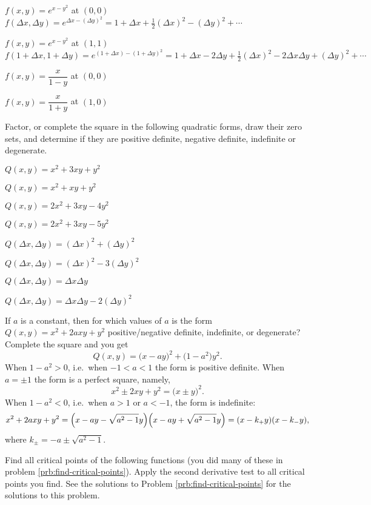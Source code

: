 \begin{multicols}{2}
\subprob  $f(x, y) =e^{x-y^2}$ at $(0,0)$ 
\answer
$f(\Delta x,\Delta y) = e^{\Delta x-(\Delta y)^2} =
1+\Delta x+\frac{1}{2}(\Delta x)^2 -(\Delta y)^2+\cdots$
\endanswer

\subprob  $f(x, y) =e^{x-y^2}$ at $(1,1)$
\answer
$f(1+\Delta x, 1+\Delta y)
= e^{(1+\Delta x)-(1+\Delta y)^2}
=
1+\Delta x - 2\Delta y+ \frac{1}{2}(\Delta x)^2 - 2\Delta x\Delta y
+(\Delta y)^2+\cdots$
\endanswer

\subprob  $f(x, y) =\dfrac{x}{1-y}$ at $(0,0)$ 

\subprob  $f(x, y) =\dfrac{x}{1+y}$ at $(1,0)$ 

\problem Factor, or complete the square in the following quadratic 
forms, draw their zero sets, and determine if they are positive
definite, negative definite, indefinite or degenerate.

\subprob $Q(x, y) = x^2+3xy+y^2$ 

\subprob $Q(x, y) = x^2 + xy + y^2$  

\subprob $Q(x, y) = 2x^2 +3xy - 4y^2$  

\subprob $Q(x, y) = 2x^2 + 3xy - 5y^2$ 

\subprob $Q(\Delta x, \Delta y) = (\Delta x)^2 + (\Delta y)^2$  

\subprob $Q(\Delta x, \Delta y) = (\Delta x)^2 - 3(\Delta y)^2$  

\subprob $Q(\Delta x, \Delta y) = \Delta x \Delta y$ 

\subprob $Q(\Delta x, \Delta y) = \Delta x \Delta y -2 (\Delta y)^2$ 

\problem If $a$ is a constant, then for which values 
of $a$ is the form $Q(x, y) = x^2 + 2axy + y^2$ positive/negative
definite, indefinite, or degenerate?
\answer  Complete the square and you get
\[
Q(x, y) = \bigl(x-ay\bigr)^2 + \bigl(1- a^2\bigr)y^2. 
\]
When $1-a^2>0$, i.e.\ when $-1<a<1$ the form is positive definite.
When $a=\pm 1$ the form is a perfect square, namely, 
\[
x^2 \pm 2xy + y^2 = \bigl(x\pm y\bigr)^2.
\]
When $1-a^2<0$, i.e.\ when $a>1$ or $a<-1$, the form is indefinite:
\[
x^2 + 2axy + y^2 = 
\Bigl(x-ay-\sqrt{a^2-1}y\Bigr)
\Bigl(x-ay+\sqrt{a^2-1}y\Bigr)
=(x-k_+y)(x-k_-y),
\]
where $k_\pm = -a \pm \sqrt{a^2-1}$.

\endanswer

\problem \label{prb:lots-of-2nd-deriv-tests} 
Find all critical points of the following functions (you did many of
these in problem \ref{prb:find-critical-points}).  Apply the second
derivative test to all critical points you find.
\answer 
See the solutions to Problem \ref{prb:find-critical-points} for the
solutions to this problem.
\endanswer


\end{multicols}
